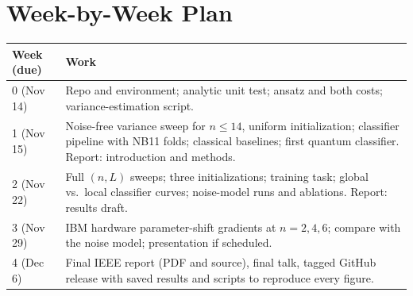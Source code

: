 \documentclass[conference]{IEEEtran}
\begin{document}
\section{Week-by-Week Plan}
{\small\noindent
\begin{tabular}{@{}p{}p{}@{}}
\toprule
Week (due) & Work \\
\midrule
0 (Nov 14) & Repo and environment; analytic unit test; ansatz and both costs; variance-estimation script. \\
1 (Nov 15) & Noise-free variance sweep for $n\le 14$, uniform initialization; classifier pipeline with NB11 folds; classical baselines; first quantum classifier. Report: introduction and methods. \\
2 (Nov 22) & Full $(n,L)$ sweeps; three initializations; training task; global vs.\ local classifier curves; noise-model runs and ablations. Report: results draft. \\
3 (Nov 29) & IBM hardware parameter-shift gradients at $n=2,4,6$; compare with the noise model; presentation if scheduled. \\
4 (Dec 6) & Final IEEE report (PDF and source), final talk, tagged GitHub release with saved results and scripts to reproduce every figure. \\
\bottomrule
\end{tabular}\par}
\end{document}
